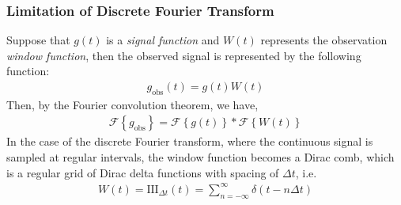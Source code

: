     		\subsubsection{Limitation of Discrete Fourier Transform}
    			Suppose that $g(t)$ is a \textit{signal function} and $W(t)$ represents the observation \textit{window function}, then the observed signal is represented by the following function:
    			\begin{align}
    				g_\text{obs}(t)=g(t)W(t) \label{eqn:obs-func}
    			\end{align}
    			Then, by the Fourier convolution theorem, we have,
    			\begin{align}
    				\mathscr{F}\left\lbrace g_\text{obs} \right\rbrace = \mathscr{F}\left\lbrace g(t) \right\rbrace * \mathscr{F}\left\lbrace W(t) \right\rbrace
    			\end{align}
    			In the case of the discrete Fourier transform, where the continuous signal is sampled at regular intervals, the window function becomes a Dirac comb, which is a regular grid of Dirac delta functions with spacing of $\Delta t$, i.e.
    			\begin{align}
    				W(t)=\text{III}_{\Delta t}(t)=\sum_{n=-\infty}^{\infty}{\delta(t-n\Delta t)} \label{eqn:dirac-comb}
    			\end{align}
    			
